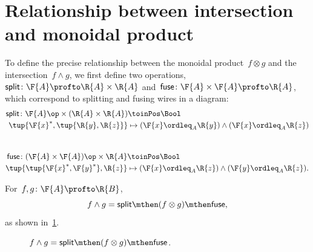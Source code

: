 \section{Relationship between intersection and monoidal product}
To define the precise relationship between the monoidal product~$f \otimes g$ and the intersection~$f \wedge g$, we first define two operations,~$\mathsf{split} \colon \F{A} \profto \R{A} \times \R{A}$ and~$\mathsf{fuse} \colon \F{A} \times \F{A} \profto \R{A}$, which correspond to splitting and fusing wires in a diagram:
\begin{equation}
    \begin{aligned}
        \mathsf{split} \colon \F{A}\op \times (\R{A} \times \R{A}) & \toinPos \Bool \\
        \tup{\F{x}^*, \tup{\R{y}, \R{z}}}                          & \mapsto (\F{x} \ordleq_A \R{y}) \wedge (\F{x} \ordleq_A \R{z})
    \end{aligned}
\end{equation}
~
\begin{equation}
    \begin{aligned}
        \mathsf{fuse} \colon (\F{A} \times \F{A})\op \times \R{A} & \toinPos \Bool \\
        \tup{\tup{\F{x}^*, \F{y}^*}, \R{z}}                       & \mapsto (\F{x} \ordleq_A \R{z}) \wedge (\F{y} \ordleq_A \R{z}).
    \end{aligned}
\end{equation}

\begin{lemma}
    \label{lem:intersection_split}
    For~$f,g \colon \F{A} \profto \R{B}$,
    \begin{equation}
        f \wedge g = \mathsf{split} \mthen (f \otimes g) \mthen \mathsf{fuse},
    \end{equation}
    as shown in~\cref{fig:lemmasplitfuse}.
\end{lemma}

\begin{figure}[h!]
    \begin{center}
    \end{center}
    \caption{$f \wedge g = \mathsf{split} \mthen (f \otimes g) \mthen \mathsf{fuse}$. }
    \label{fig:lemmasplitfuse}
\end{figure}

